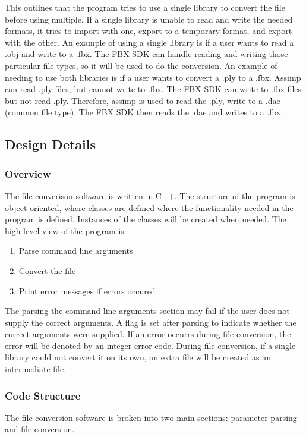         This outlines that the program tries to use a single library to convert the file before using multiple.  If a single library is unable to 
        read and write the needed formats, it tries to import with one, export to a temporary format, and export with the other.  An example of 
        using a single library is if a user wants to read a .obj and write to a .fbx.  The FBX SDK can handle reading and writing those particular file
        types, so it will be used to do the conversion.  An example of needing to use both libraries is if a user wants to convert a .ply to a .fbx.
        Assimp can read .ply files, but cannot write to .fbx.  The FBX SDK can write to .fbx files but not read .ply.  Therefore, assimp is used to 
        read the .ply, write to a .dae (common file type).  The FBX SDK then reads the .dae and writes to a .fbx.

    \subsection{Design Details}

    \subsubsection{Overview}

    The file converison software is written in C++.  The structure of the program is object oriented, where classes are defined where the functionality needed
    in the program is defined.  Instances of the classes will be created when needed.  
    The high level view of the program is:
    \begin{enumerate}
        \item Parse command line arguments
        \item Convert the file
        \item Print error messages if errors occured
    \end{enumerate}

    The parsing the command line arguments section may fail if the user does not supply the correct arguments.  A flag is set after parsing to indicate
    whether the correct arguments were supplied.  If an error occurrs during file conversion, the error will be denoted by an integer error code.  
    During file conversion, if a single library could not convert it on its own, an extra file will be created as an intermediate file.

    \subsubsection{Code Structure}
    The file conversion software is broken into two main sections: parameter parsing and file conversion.

